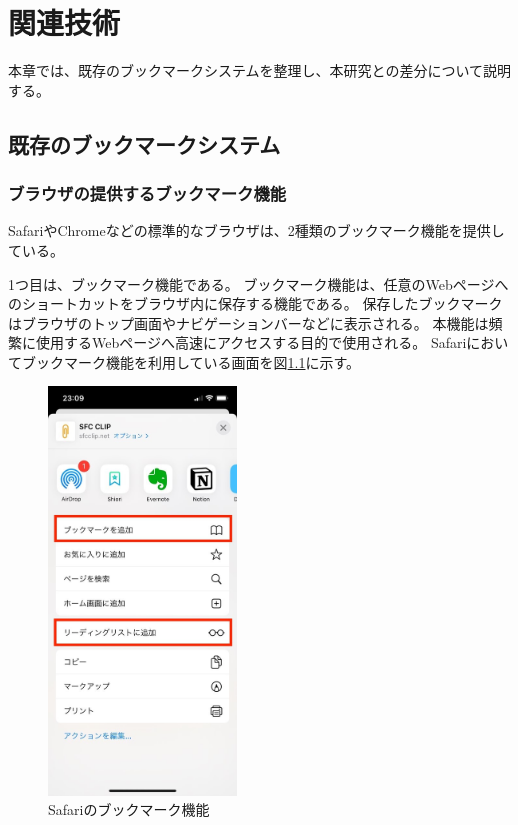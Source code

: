 \chapter{関連技術}
\label{chap:related_works}

本章では、既存のブックマークシステムを整理し、本研究との差分について説明する。

\section{既存のブックマークシステム}

\subsection{ブラウザの提供するブックマーク機能}
SafariやChromeなどの標準的なブラウザは、2種類のブックマーク機能を提供している。

1つ目は、ブックマーク機能である。
ブックマーク機能は、任意のWebページへのショートカットをブラウザ内に保存する機能である。
保存したブックマークはブラウザのトップ画面やナビゲーションバーなどに表示される。
本機能は頻繁に使用するWebページへ高速にアクセスする目的で使用される。
Safariにおいてブックマーク機能を利用している画面を図\ref{fig:safari-bookmark}に示す。

\begin{figure}[htbp]
  \caption{Safariのブックマーク機能}
  \label{fig:safari-bookmark}
  \begin{center}
    \includegraphics[bb=0 0 585 1266,width=5cm]{img/020_related_works/safari-bookmark.pdf}
  \end{center}
\end{figure}

